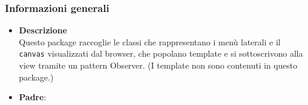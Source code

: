 \subsubsection{Informazioni generali}
\begin{figure}[h]
\centering
{}
\caption{}
\end{figure}
\FloatBarrier
\begin{itemize}
\item \textbf{Descrizione}\\
Questo package raccoglie le classi che rappresentano i menù laterali e il \texttt{canvas} visualizzati dal browser, che popolano template e si sottoscrivono alla view tramite un pattern Observer. (I template non sono contenuti in questo package.)
\item \textbf{Padre}: \hyperref[\nogloxy{swedesigner::client}]{}
\end{itemize}
